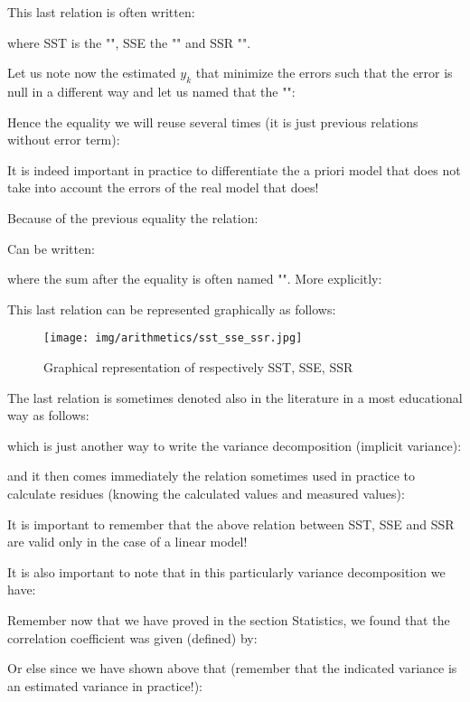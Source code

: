	This last relation is often written:
	
	where SST is the "", SSE the "" and SSR "".
	
	Let us note now the estimated $y_k$ that minimize the errors such that the error is null in a different way and let us named that the "":
	
	Hence the equality we will reuse several times (it is just previous relations without error term):
	
	It is indeed important in practice to differentiate the a priori model that does not take into account the errors of the real model that does!
	
	Because of the previous equality the relation:
	
	Can be written:
	
	where the sum after the equality is often named "". More explicitly:
	
	This last relation can be represented graphically as follows:
\begin{figure}[H]
\centering
\texttt{[image: img/arithmetics/sst\_sse\_ssr.jpg]}
\caption{Graphical representation of respectively SST, SSE, SSR}
\end{figure}

The last relation is sometimes denoted also in the literature in a most educational way as follows:

	which is just another way to write the variance decomposition (implicit variance):
	
	
	and it then comes immediately the relation sometimes used in practice to calculate residues (knowing the calculated values and measured values):
	
	It is important to remember that the above relation between SST, SSE and SSR are valid only in the case of a linear model!
	
	It is also important to note that in this particularly variance decomposition we have:
	
	Remember now that we have proved in the section Statistics, we found that the correlation coefficient was given (defined) by:
	
	Or else since we have shown above that (remember that the indicated variance is an estimated variance in practice!):
	
